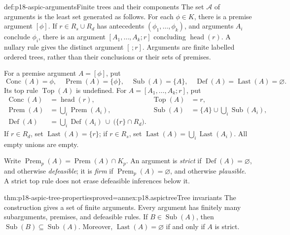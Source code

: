 \begin{hbdefinition}{def:p18-aspic-arguments}{Finite trees and their components}
The set \(\mathcal A\) of arguments is the least set generated as follows.
For each \(\phi\in K\), there is a premise argument \([\phi]\).
If \(r\in R_s\cup R_d\) has antecedents
\((\phi_1,\ldots,\phi_k)\), and arguments \(A_i\) conclude \(\phi_i\),
there is an argument \([A_1,\ldots,A_k;r]\) concluding
\(\operatorname{head}(r)\). A nullary rule gives the distinct argument
\([\,;r]\). Arguments are finite labelled ordered trees, rather than
their conclusions or their sets of premises.

For a premise argument \(A=[\phi]\), put
\[
 \operatorname{Conc}(A)=\phi,\quad
 \operatorname{Prem}(A)=\{\phi\},\quad
 \operatorname{Sub}(A)=\{A\},\quad
 \operatorname{Def}(A)=\operatorname{Last}(A)=\varnothing .
\]
Its top rule \(\operatorname{Top}(A)\) is undefined.
For \(A=[A_1,\ldots,A_k;r]\), put
\[
\begin{aligned}
 \operatorname{Conc}(A)&=\operatorname{head}(r),&
 \operatorname{Top}(A)&=r,\\
 \operatorname{Prem}(A)&=\bigcup_i\operatorname{Prem}(A_i),&
 \operatorname{Sub}(A)&=\{A\}\cup\bigcup_i\operatorname{Sub}(A_i),\\
 \operatorname{Def}(A)&=\bigcup_i\operatorname{Def}(A_i)
                   \ \cup\ \bigl(\{r\}\cap R_d\bigr).
\end{aligned}
\]
If \(r\in R_d\), set \(\operatorname{Last}(A)=\{r\}\); if \(r\in R_s\),
set \(\operatorname{Last}(A)=\bigcup_i\operatorname{Last}(A_i)\).
All empty unions are empty.

Write \(\operatorname{Prem}_p(A)=\operatorname{Prem}(A)\cap K_p\).
An argument is \emph{strict} if \(\operatorname{Def}(A)=\varnothing\),
and otherwise \emph{defeasible}; it is \emph{firm} if
\(\operatorname{Prem}_p(A)=\varnothing\), and otherwise \emph{plausible}.
A strict top rule does not erase defeasible inferences below it.
\end{hbdefinition}

\begin{hblemma}{thm:p18-aspic-tree-properties}{proved=annex:p18.aspictree}{Tree invariants}
The construction gives a set of finite arguments. Every argument has finitely
many subarguments, premises, and defeasible rules.
If \(B\in\operatorname{Sub}(A)\), then
\(\operatorname{Sub}(B)\subseteq\operatorname{Sub}(A)\).
Moreover,
\(\operatorname{Last}(A)=\varnothing\) if and only if \(A\) is strict.
\end{hblemma}

